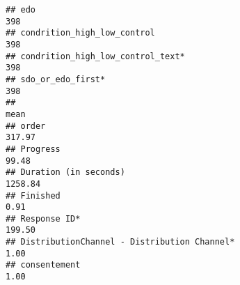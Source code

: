 \documentclass[
]{article}
\begin{document}
\begin{verbatim}
## edo                                                                                                                                                                                                                        398
## condrition_high_low_control                                                                                                                                                                                                398
## condrition_high_low_control_text*                                                                                                                                                                                          398
## sdo_or_edo_first*                                                                                                                                                                                                          398
##                                                                                                                                                                                                                               mean
## order                                                                                                                                                                                                                       317.97
## Progress                                                                                                                                                                                                                     99.48
## Duration (in seconds)                                                                                                                                                                                                      1258.84
## Finished                                                                                                                                                                                                                      0.91
## Response ID*                                                                                                                                                                                                                199.50
## DistributionChannel - Distribution Channel*                                                                                                                                                                                   1.00
## consentement                                                                                                                                                                                                                  1.00

\end{verbatim}
\end{document}
